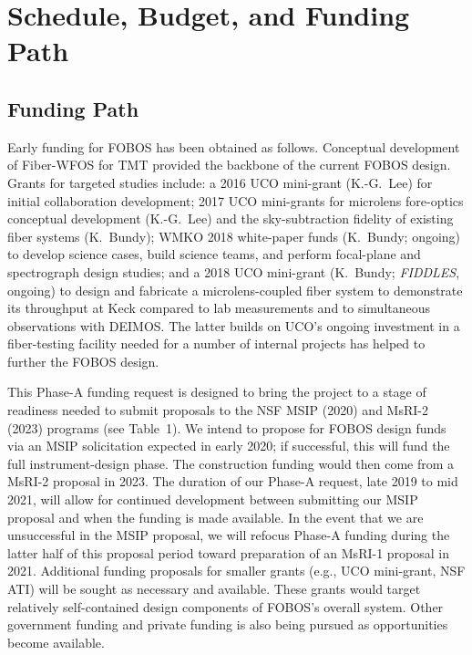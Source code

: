 
\section{Schedule, Budget, and Funding Path}
\label{sec:budget}

\subsection{Funding Path}

Early funding for FOBOS has been obtained as follows. Conceptual
development of Fiber-WFOS for TMT provided the backbone of the
current FOBOS design. Grants for targeted studies include: a 2016 UCO
mini-grant (K.-G.~Lee) for initial collaboration development; 2017
UCO mini-grants for microlens fore-optics conceptual development
(K.-G.~Lee) and the sky-subtraction fidelity of existing fiber
systems (K.~Bundy); WMKO 2018 white-paper funds (K.~Bundy; ongoing)
to develop science cases, build science teams, and perform
focal-plane and spectrograph design studies; and a 2018 UCO
mini-grant (K.~Bundy; {\it FIDDLES}, ongoing) to design and fabricate
a microlens-coupled fiber system to demonstrate its throughput at
Keck compared to lab measurements and to simultaneous observations
with DEIMOS. The latter builds on UCO's ongoing investment in a
fiber-testing facility needed for a number of internal projects has
helped to further the FOBOS design.

This Phase-A funding request is designed to bring the project to a
stage of readiness needed to submit proposals to the NSF MSIP (2020)
and MsRI-2 (2023) programs (see Table~1). We intend to propose for
FOBOS design funds via an MSIP solicitation expected in early 2020;
if successful, this will fund the full instrument-design phase. The
construction funding would then come from a MsRI-2 proposal in 2023.
The duration of our Phase-A request, late 2019 to mid 2021, will
allow for continued development between submitting our MSIP proposal
and when the funding is made available. In the event that we are
unsuccessful in the MSIP proposal, we will refocus Phase-A funding
during the latter half of this proposal period toward preparation of
an MsRI-1 proposal in 2021. Additional funding proposals for smaller
grants (e.g., UCO mini-grant, NSF ATI) will be sought as necessary
and available. These grants would target relatively self-contained
design components of FOBOS's overall system. Other government funding
and private funding is also being pursued as opportunities become
available.

